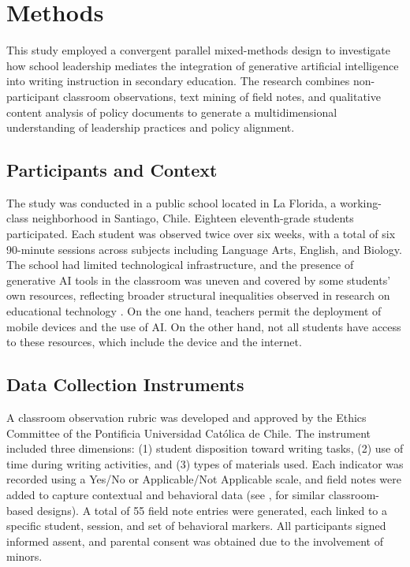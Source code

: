 \documentclass[english]{textolivre}
\begin{document}
\section{Methods}\label{sec-fmt-manuscrito}
This study employed a convergent parallel mixed-methods design \cite{creswell2018designing} to investigate how school leadership mediates the integration of generative artificial intelligence into writing instruction in secondary education. The research combines non-participant classroom observations, text mining of field notes, and qualitative content analysis of policy documents to generate a multidimensional understanding of leadership practices and policy alignment.

\subsection{Participants and Context}
The study was conducted in a public school located in La Florida, a working-class neighborhood in Santiago, Chile. Eighteen eleventh-grade students participated. Each student was observed twice over six weeks, with a total of six 90-minute sessions across subjects including Language Arts, English, and Biology. The school had limited technological infrastructure, and the presence of generative AI tools in the classroom was uneven and covered by some students’ own resources, reflecting broader structural inequalities observed in research on educational technology \cite{unesco2021reimagining,atuahene2024overcoming}. On the one hand, teachers permit the deployment of mobile devices and the use of AI. On the other hand, not all students have access to these resources, which include the device and the internet.

\subsection{Data Collection Instruments}
        
A classroom observation rubric was developed and approved by the Ethics Committee of the Pontificia Universidad Católica de Chile. The instrument included three dimensions: (1) student disposition toward writing tasks, (2) use of time during writing activities, and (3) types of materials used. Each indicator was recorded using a Yes/No or Applicable/Not Applicable scale, and field notes were added to capture contextual and behavioral data (see \textcite{andrewstodd2020collaborative}, for similar classroom-based designs). A total of 55 field note entries were generated, each linked to a specific student, session, and set of behavioral markers. All participants signed informed assent, and parental consent was obtained due to the involvement of minors.
\end{document}
